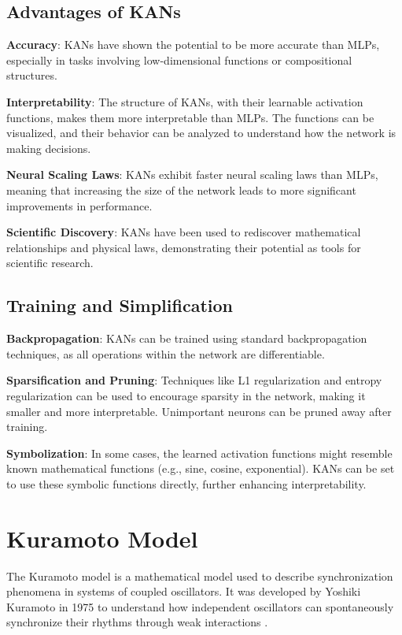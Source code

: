 \documentclass{article}
\begin{document}
\subsection{Advantages of KANs}

\textbf{Accuracy}: KANs have shown the potential to be more accurate than MLPs, especially in tasks involving low-dimensional functions or compositional structures.

\textbf{Interpretability}: The structure of KANs, with their learnable activation functions, makes them more interpretable than MLPs. The functions can be visualized, and their behavior can be analyzed to understand how the network is making decisions.

\textbf{Neural Scaling Laws}: KANs exhibit faster neural scaling laws than MLPs, meaning that increasing the size of the network leads to more significant improvements in performance.

\textbf{Scientific Discovery}: KANs have been used to rediscover mathematical relationships and physical laws, demonstrating their potential as tools for scientific research.

\subsection{Training and Simplification}

\textbf{Backpropagation}: KANs can be trained using standard backpropagation techniques, as all operations within the network are differentiable.

\textbf{Sparsification and Pruning}: Techniques like L1 regularization and entropy regularization can be used to encourage sparsity in the network, making it smaller and more interpretable. Unimportant neurons can be pruned away after training.

\textbf{Symbolization}: In some cases, the learned activation functions might resemble known mathematical functions (e.g., sine, cosine, exponential). KANs can be set to use these symbolic functions directly, further enhancing interpretability.

\section*{Kuramoto Model}

The Kuramoto model is a mathematical model used to describe synchronization phenomena in systems of coupled oscillators. It was developed by Yoshiki Kuramoto in 1975 to understand how independent oscillators can spontaneously synchronize their rhythms through weak interactions \cite{thompson2003neurofeedback, oster1973auditory}.
\end{document}
